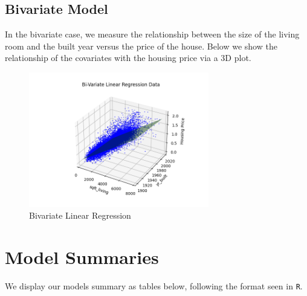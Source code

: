 \documentclass[11pt,a4paper]{article}
\begin{document}
\subsection{Bivariate Model}
In the bivariate case, we measure the relationship between the size of the
living room and the built year versus the price of the house. Below we show the
relationship of the covariates with the housing price via a 3D plot.
\begin{figure}[H]
    \centering
    \includegraphics*[width=0.7\textwidth]{multi_data.png}
    \caption{Bivariate Linear Regression}
    \label{fig: bivariate}
\end{figure}

\section{Model Summaries}

We display our models summary as tables below, following the format seen in
\verb|R|.
\end{document}
